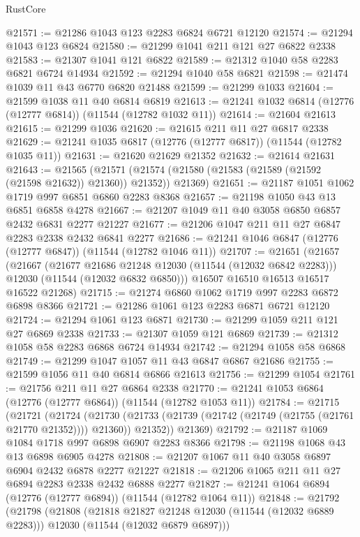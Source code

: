 \begin{lexlean}{RustCore}
\begin{coremodule}
@21571 := @21286 @1043 @123 @2283 @6824 @6721 @12120
@21574 := @21294 @1043 @123 @6824
@21580 := @21299 @1041 @211 @121 @27 @6822 @2338
@21583 := @21307 @1041 @121 @6822
@21589 := @21312 @1040 @58 @2283 @6821 @6724 @14934
@21592 := @21294 @1040 @58 @6821
@21598 := @21474 @1039 @11 @43 @6770 @6820 @21488
@21599 := @21299 @1033
@21604 := @21599 @1038 @11 @40 @6814 @6819
@21613 := @21241 @1032 @6814 (@12776 (@12777 @6814)) (@11544 (@12782 @1032 @11))
@21614 := @21604 @21613
@21615 := @21299 @1036
@21620 := @21615 @211 @11 @27 @6817 @2338
@21629 := @21241 @1035 @6817 (@12776 (@12777 @6817)) (@11544 (@12782 @1035 @11))
@21631 := @21620 @21629 @21352
@21632 := @21614 @21631
@21643 := @21565
    (@21571 (@21574 (@21580 (@21583 (@21589 (@21592 (@21598 @21632)) @21360)) @21352)) @21369)
@21651 := @21187 @1051 @1062 @1719 @997 @6851 @6860 @2283 @8368
@21657 := @21198 @1050 @43 @13 @6851 @6858 @4278
@21667 := @21207 @1049 @11 @40 @3058 @6850 @6857 @2432 @6831 @2277 @21227
@21677 := @21206 @1047 @211 @11 @27 @6847 @2283 @2338 @2432 @6841 @2277
@21686 := @21241 @1046 @6847 (@12776 (@12777 @6847)) (@11544 (@12782 @1046 @11))
@21707 := @21651
    (@21657
      (@21667
        (@21677 @21686 @21248 @12030 (@11544 (@12032 @6842 @2283)))
        @12030
        (@11544 (@12032 @6832 @6850)))
      @16507
      @16510
      @16513
      @16517
      @16522
      @21268)
@21715 := @21274 @6860 @1062 @1719 @997 @2283 @6872 @6898 @8366
@21721 := @21286 @1061 @123 @2283 @6871 @6721 @12120
@21724 := @21294 @1061 @123 @6871
@21730 := @21299 @1059 @211 @121 @27 @6869 @2338
@21733 := @21307 @1059 @121 @6869
@21739 := @21312 @1058 @58 @2283 @6868 @6724 @14934
@21742 := @21294 @1058 @58 @6868
@21749 := @21299 @1047 @1057 @11 @43 @6847 @6867 @21686
@21755 := @21599 @1056 @11 @40 @6814 @6866 @21613
@21756 := @21299 @1054
@21761 := @21756 @211 @11 @27 @6864 @2338
@21770 := @21241 @1053 @6864 (@12776 (@12777 @6864)) (@11544 (@12782 @1053 @11))
@21784 := @21715
    (@21721
      (@21724
        (@21730 (@21733 (@21739 (@21742 (@21749 (@21755 (@21761 @21770 @21352)))) @21360)) @21352))
      @21369)
@21792 := @21187 @1069 @1084 @1718 @997 @6898 @6907 @2283 @8366
@21798 := @21198 @1068 @43 @13 @6898 @6905 @4278
@21808 := @21207 @1067 @11 @40 @3058 @6897 @6904 @2432 @6878 @2277 @21227
@21818 := @21206 @1065 @211 @11 @27 @6894 @2283 @2338 @2432 @6888 @2277
@21827 := @21241 @1064 @6894 (@12776 (@12777 @6894)) (@11544 (@12782 @1064 @11))
@21848 := @21792
    (@21798
      (@21808
        (@21818 @21827 @21248 @12030 (@11544 (@12032 @6889 @2283)))
        @12030
        (@11544 (@12032 @6879 @6897)))

\end{coremodule}
\end{lexlean}
